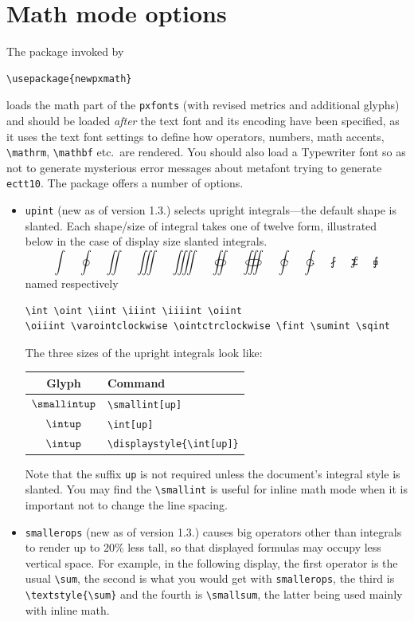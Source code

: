 \documentclass[11pt]{article}
\theoremstyle{oldplain}
\theoremstyle{plain}
\begin{document}
\section{Math mode options}
The package invoked by
\begin{verbatim}
\usepackage{newpxmath}
\end{verbatim}
loads the math part of the {\tt pxfonts} (with revised metrics and additional glyphs) and should be loaded \emph{after} the text font and its encoding have been specified, as it uses the text font settings to define how operators, numbers, math accents, \verb|\mathrm|, \verb|\mathbf| etc.\ are rendered. You should also load a Typewriter font so as not to generate mysterious error messages about \textsf{metafont} trying to generate \texttt{ectt10}. The package offers a number of options.
\begin{itemize}
\item {\tt upint} (new as of version 1.3.) selects upright integrals---the default shape is slanted. Each shape/size of integral takes one of twelve form, illustrated below in the case of display size slanted integrals.
\[\int\quad\oint\quad\iint\quad\iiint\quad\iiiint\quad\oiint\quad\oiiint\quad\varointclockwise\quad\ointctrclockwise\quad\fint\quad\sumint\quad\sqint\]
named respectively
\begin{verbatim}
\int \oint \iint \iiint \iiiint \oiint 
\oiiint \varointclockwise \ointctrclockwise \fint \sumint \sqint
\end{verbatim}
The three sizes of the upright integrals look like:
\begin{center}
  \begin{tabular}{@{} cl @{}}
    \hline
    Glyph & Command\\ 
    \hline
    $\smallintup$ & \verb|\smallint[up]|\\ 
    $\intup$ & \verb|\int[up]|  \\ 
    $\displaystyle{\intup}$ & \verb|\displaystyle{\int[up]}|\\ 
    \hline
  \end{tabular}
\end{center}
Note that the suffix {\tt up} is not required unless the document's integral style is slanted. You may find the \verb|\smallint| is useful for inline math mode when it is important not to change the line spacing.
\item {\tt smallerops} (new as of version 1.3.) causes big operators other than integrals to render up to 20\% less tall, so that displayed formulas may occupy less vertical space. For example, in the following display, the first operator is the usual \verb|\sum|, the second is what you would get with {\tt smallerops}, the third is \verb|\textstyle{\sum}| and the fourth is \verb|\smallsum|, the latter being used mainly with inline math. 

\end{itemize}
\end{document}
